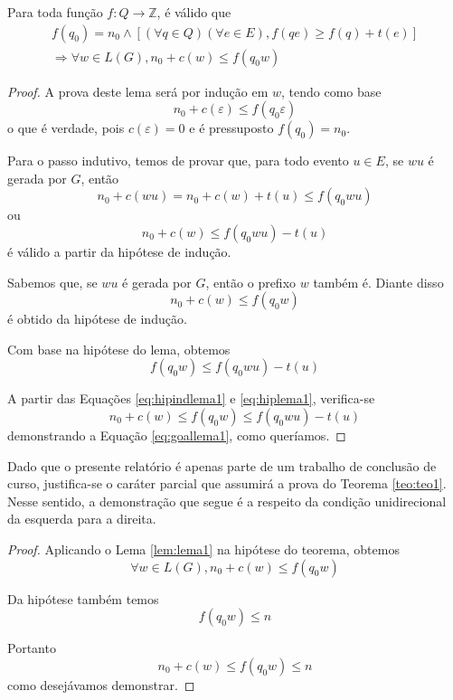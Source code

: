 \begin{lem}
	\label{lem:lema1}
	Para toda função $f : Q \to \mathbb{Z}$, é válido que\begin{equation*}
	\begin{aligned}
	f(q_0) = n_0 \wedge [(\forall q \in Q)(\forall e \in E), f(qe) \geq f(q) + t(e)]\\\Rightarrow \forall w \in L(G), n_0 + c(w) \leq f(q_0w)
	\end{aligned}
	\end{equation*}
\end{lem}
\begin{proof}
A prova deste lema será por indução em $w$, tendo como base $$n_0 + c(\varepsilon) \leq f(q_0\varepsilon)$$ o que é verdade, pois $c(\varepsilon) = 0$ e é pressuposto $f(q_0) = n_0$.

Para o passo indutivo, temos de provar que, para todo evento $u \in E$, se $ wu$ é gerada por $G$, então $$n_0 + c(wu) = n_0 + c(w) + t(u) \leq f(q_0wu)$$ ou \begin{equation}
\label{eq:goallema1}
n_0 + c(w) \leq f(q_0wu) - t(u)
\end{equation} é válido a partir da hipótese de indução.

Sabemos que, se $wu$ é gerada por $G$, então o prefixo $w$ também é. Diante disso \begin{equation}
\label{eq:hipindlema1}
n_0 + c(w) \leq f(q_0w)
\end{equation} é obtido da hipótese de indução.

Com base na hipótese do lema, obtemos \begin{equation}
\label{eq:hiplema1}
f(q_0w) \leq f(q_0wu) - t(u)
\end{equation}

A partir das Equações \ref{eq:hipindlema1} e \ref{eq:hiplema1}, verifica-se $$n_0 + c(w) \leq f(q_0w) \leq f(q_0wu) - t(u)$$ demonstrando a Equação \ref{eq:goallema1}, como queríamos.
\end{proof}

Dado que o presente relatório é apenas parte de um trabalho de conclusão de curso, justifica-se o caráter parcial que assumirá a prova do Teorema \ref{teo:teo1}. Nesse sentido, a demonstração que segue é a respeito da condição unidirecional da esquerda para a direita.

\begin{proof}
Aplicando o Lema \ref{lem:lema1} na hipótese do teorema, obtemos $$\forall w \in L(G), n_0 + c(w) \leq f(q_0w)$$

Da hipótese também temos $$f(q_0w) \leq n$$

Portanto $$n_0 + c(w) \leq f(q_0w) \leq n$$ como desejávamos demonstrar.
\end{proof}

